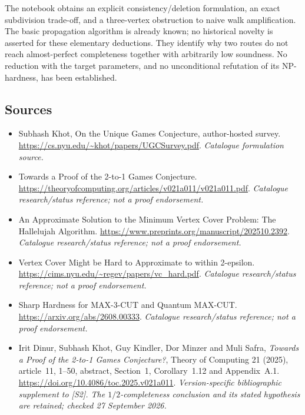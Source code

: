 \documentclass[11pt,a4paper]{article}
\numberwithin{equation}{section}
\begin{document}
The notebook obtains an explicit consistency/deletion formulation, an
exact subdivision trade-off, and a three-vertex obstruction to naive walk
amplification. The basic propagation algorithm is already known; no
historical novelty is asserted for these elementary deductions. They
identify why two routes do not reach almost-perfect completeness together
with arbitrarily low soundness. No reduction with the target parameters,
and no unconditional refutation of its NP-hardness, has been established.


\subsection{Sources}
\begin{itemize}\raggedright
\item[\textnormal{[S1]}]\hypertarget{source:43:1}{} Subhash Khot, On the Unique Games Conjecture, author-hosted survey.
\url{https://cs.nyu.edu/~khot/papers/UGCSurvey.pdf}.
{\small\textit{Catalogue formulation source.}}
\item[\textnormal{[S2]}]\hypertarget{source:43:2}{} Towards a Proof of the 2-to-1 Games Conjecture.
\url{https://theoryofcomputing.org/articles/v021a011/v021a011.pdf}.
{\small\textit{Catalogue research/status reference; not a proof endorsement.}}
\item[\textnormal{[S3]}]\hypertarget{source:43:3}{} An Approximate Solution to the Minimum Vertex Cover Problem: The Hallelujah Algorithm.
\url{https://www.preprints.org/manuscript/202510.2392}.
{\small\textit{Catalogue research/status reference; not a proof endorsement.}}
\item[\textnormal{[S4]}]\hypertarget{source:43:4}{} Vertex Cover Might be Hard to Approximate to within 2-epsilon.
\url{https://cims.nyu.edu/~regev/papers/vc_hard.pdf}.
{\small\textit{Catalogue research/status reference; not a proof endorsement.}}
\item[\textnormal{[S5]}]\hypertarget{source:43:5}{} Sharp Hardness for MAX-3-CUT and Quantum MAX-CUT.
\url{https://arxiv.org/abs/2608.00333}.
{\small\textit{Catalogue research/status reference; not a proof endorsement.}}
\item[\textnormal{[E1]}]\hypertarget{extra:43:1}{} Irit Dinur, Subhash Khot,
Guy Kindler, Dor Minzer and Muli Safra, \emph{Towards a Proof of the
2-to-1 Games Conjecture?}, Theory of Computing 21 (2025), article~11,
1--50, abstract, Section~1, Corollary~1.12 and Appendix~A.1.
\url{https://doi.org/10.4086/toc.2025.v021a011}.
{\small\textit{Version-specific bibliographic supplement to [S2]. The
$1/2$-completeness conclusion and its stated hypothesis are retained;
checked 27 September 2026.}}

\end{itemize}

\end{document}
